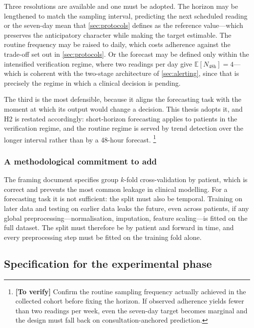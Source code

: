 \documentclass[12pt,a4paper,oneside]{report}
\newcommand{\verify}[1]{\footnote{\textbf{[To verify]} #1}}
\begin{document}
Three resolutions are available and one must be adopted. The horizon may be lengthened to match the sampling interval, predicting the next scheduled reading or the seven-day mean that \cref{sec:protocols} defines as the reference value---which preserves the anticipatory character while making the target estimable. The routine frequency may be raised to daily, which costs adherence against the trade-off set out in \cref{sec:protocols}. Or the forecast may be defined only within the intensified verification regime, where two readings per day give $\mathbb{E}[N_{48\text{h}}] = 4$---which is coherent with the two-stage architecture of \cref{sec:alerting}, since that is precisely the regime in which a clinical decision is pending.

The third is the most defensible, because it aligns the forecasting task with the moment at which its output would change a decision. This thesis adopts it, and H2 is restated accordingly: short-horizon forecasting applies to patients in the verification regime, and the routine regime is served by trend detection over the longer interval rather than by a 48-hour forecast.%
\verify{Confirm the routine sampling frequency actually achieved in the collected cohort before fixing the horizon. If observed adherence yields fewer than two readings per week, even the seven-day target becomes marginal and the design must fall back on consultation-anchored prediction.}

\subsubsection{A methodological commitment to add}

The framing document specifies group $k$-fold cross-validation by patient, which is correct and prevents the most common leakage in clinical modelling. For a forecasting task it is not sufficient: the split must also be temporal. Training on later data and testing on earlier data leaks the future, even across patients, if any global preprocessing---normalisation, imputation, feature scaling---is fitted on the full dataset. The split must therefore be by patient and forward in time, and every preprocessing step must be fitted on the training fold alone.

\subsection{Specification for the experimental phase}\label{sec:spec23}
\end{document}
